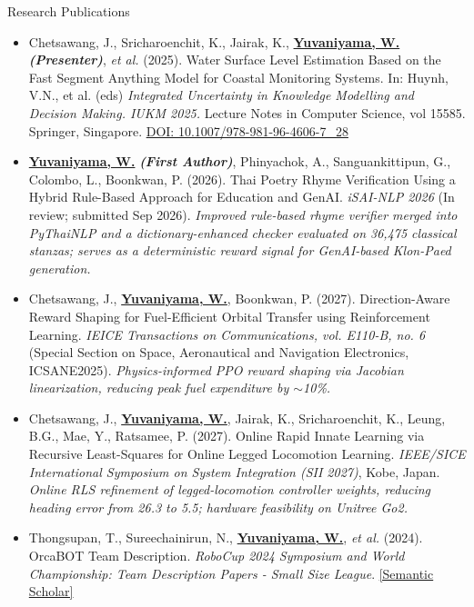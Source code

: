 \documentclass[11pt]{resume} %
\begin{document}
\begin{rSection}{Research Publications}
    \begin{itemize}[leftmargin=*]
        \item Chetsawang, J., Sricharoenchit, K., Jairak, K., \uline{\textbf{Yuvaniyama, W.}} \textbf{\textit{(Presenter)}}, \textit{et al.} (2025). Water Surface Level Estimation Based on the Fast Segment Anything Model for Coastal Monitoring Systems. In: Huynh, V.N., et al. (eds) \textit{Integrated Uncertainty in Knowledge Modelling and Decision Making. IUKM 2025.} Lecture Notes in Computer Science, vol 15585. Springer, Singapore. \href{https://doi.org/10.1007/978-981-96-4606-7_28}{DOI: 10.1007/978-981-96-4606-7\_28}

        \item \uline{\textbf{Yuvaniyama, W.}} \textbf{\textit{(First Author)}}, Phinyachok, A., Sanguankittipun, G., Colombo, L., Boonkwan, P. (2026). Thai Poetry Rhyme Verification Using a Hybrid Rule-Based Approach for Education and GenAI. \textit{iSAI-NLP 2026} (In review; submitted Sep 2026). \textit{Improved rule-based rhyme verifier merged into PyThaiNLP and a dictionary-enhanced checker evaluated on 36,475 classical stanzas; serves as a deterministic reward signal for GenAI-based Klon-Paed generation.}
        \item Chetsawang, J., \uline{\textbf{Yuvaniyama, W.}}, Boonkwan, P. (2027). Direction-Aware Reward Shaping for Fuel-Efficient Orbital Transfer using Reinforcement Learning. \textit{IEICE Transactions on Communications, vol. E110-B, no. 6} (Special Section on Space, Aeronautical and Navigation Electronics, ICSANE2025). \textit{Physics-informed PPO reward shaping via Jacobian linearization, reducing peak fuel expenditure by $\sim$10\%.}
        \item Chetsawang, J., \uline{\textbf{Yuvaniyama, W.}}, Jairak, K., Sricharoenchit, K., Leung, B.G., Mae, Y., Ratsamee, P. (2027). Online Rapid Innate Learning via Recursive Least-Squares for Online Legged Locomotion Learning. \textit{IEEE/SICE International Symposium on System Integration (SII 2027)}, Kobe, Japan. \textit{Online RLS refinement of legged-locomotion controller weights, reducing heading error from 26.3\textdegree{} to 5.5\textdegree{}; hardware feasibility on Unitree Go2.}
        \item Thongsupan, T., Sureechainirun, N., \uline{\textbf{Yuvaniyama, W.}}, \textit{et al.} (2024). OrcaBOT Team Description. \textit{RoboCup 2024 Symposium and World Championship: Team Description Papers - Small Size League}. \href{https://api.semanticscholar.org/CorpusID:272651803}{[Semantic Scholar]}
    \end{itemize}
\end{rSection}
\end{document}
